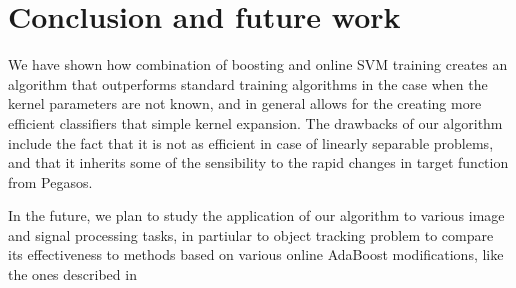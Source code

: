 \documentclass[10pt,twocolumn, a4paper]{article}
\begin{document}
\section{Conclusion and future work}
We have shown how combination of boosting and online SVM training creates an algorithm that outperforms standard training algorithms in the case when the kernel parameters are not known, and in general allows for the creating more efficient classifiers that simple kernel expansion. The drawbacks of our algorithm include the fact that it is not as efficient in case of linearly separable problems, and that it inherits some of the sensibility to the rapid changes in target function from Pegasos. 

In the future, we plan to study the application of our algorithm to various image and signal processing tasks, in partiular to object tracking problem to compare its effectiveness to methods based on various online AdaBoost modifications, like the ones described in  \cite{OnlineBoost}


\end{document}
